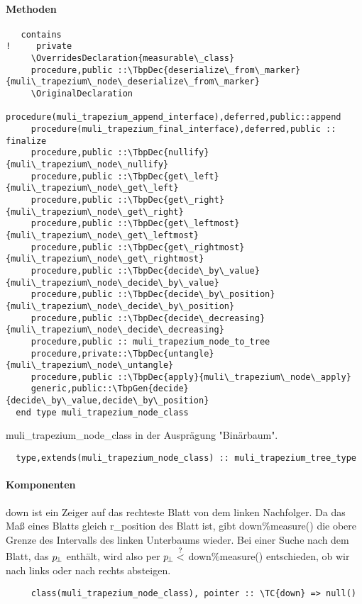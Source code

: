 \paragraph{Methoden}
\begin{Verbatim}
   contains
!     private
     \OverridesDeclaration{measurable\_class}
     procedure,public ::\TbpDec{deserialize\_from\_marker}{muli\_trapezium\_node\_deserialize\_from\_marker}
     \OriginalDeclaration
     procedure(muli_trapezium_append_interface),deferred,public::append
     procedure(muli_trapezium_final_interface),deferred,public :: finalize
     procedure,public ::\TbpDec{nullify}{muli\_trapezium\_node\_nullify}
     procedure,public ::\TbpDec{get\_left}{muli\_trapezium\_node\_get\_left}
     procedure,public ::\TbpDec{get\_right}{muli\_trapezium\_node\_get\_right}
     procedure,public ::\TbpDec{get\_leftmost}{muli\_trapezium\_node\_get\_leftmost}
     procedure,public ::\TbpDec{get\_rightmost}{muli\_trapezium\_node\_get\_rightmost}
     procedure,public ::\TbpDec{decide\_by\_value}{muli\_trapezium\_node\_decide\_by\_value}
     procedure,public ::\TbpDec{decide\_by\_position}{muli\_trapezium\_node\_decide\_by\_position}
     procedure,public ::\TbpDec{decide\_decreasing}{muli\_trapezium\_node\_decide\_decreasing}
     procedure,public :: muli_trapezium_node_to_tree
     procedure,private::\TbpDec{untangle}{muli\_trapezium\_node\_untangle}
     procedure,public ::\TbpDec{apply}{muli\_trapezium\_node\_apply}
     generic,public::\TbpGen{decide}{decide\_by\_value,decide\_by\_position}
  end type muli_trapezium_node_class
\end{Verbatim}
muli\_trapezium\_node\_class in der Ausprägung "Binärbaum".
\begin{Verbatim}
  type,extends(muli_trapezium_node_class) :: muli_trapezium_tree_type
\end{Verbatim}
\paragraph{Komponenten}

down ist ein Zeiger auf das rechteste Blatt von dem linken Nachfolger. Da das Maß eines Blatts gleich r\_position des Blatt ist, gibt down\%measure() die obere Grenze des Intervalls des linken Unterbaums wieder. Bei einer Suche nach dem Blatt, das $p_{\!\perp}$ enthält, wird also per $p_{\!\perp}\overset{?}{<}$ down\%measure() entschieden, ob wir nach links oder nach rechts absteigen.
\begin{Verbatim}
     class(muli_trapezium_node_class), pointer :: \TC{down} => null()
\end{Verbatim}
